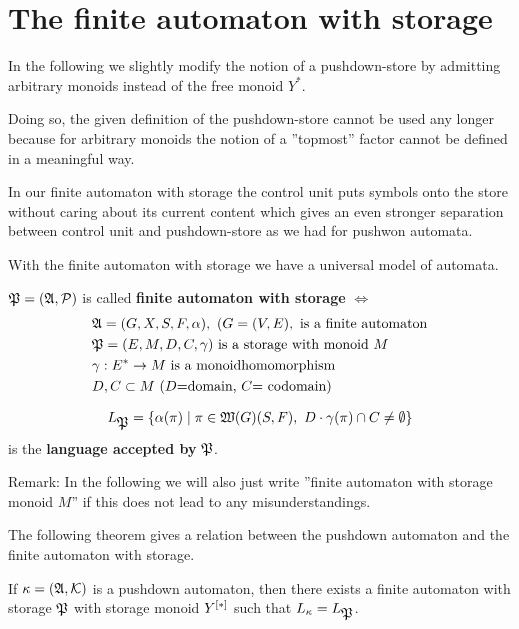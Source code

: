 \section{The finite automaton with storage}

In the following we slightly modify the notion of a pushdown-store by admitting
arbitrary monoids instead of the free monoid $Y^*$.

Doing so, the given definition of the pushdown-store cannot be used any longer
because for arbitrary monoids the notion of a ''topmost'' factor cannot be
defined in a meaningful way.

In our finite automaton with storage the control unit puts symbols onto the
store without caring about its current content which gives an even stronger
separation between control unit and pushdown-store as we had for pushwon
automata.

With the finite automaton with storage we have a universal model of automata.

\begin{definition}
$\mbox{$\mathfrak{P}$} = (\mbox{$\mathfrak{A}$}, \mbox{$\mathcal{P}$})$ is called {\bf finite automaton with storage}
$\iff$
\begin{eqnarray*}
& \mbox{$\mathfrak{A}$}=(G, X, S, F, \alpha),\ (G=(V,E),\text{ is a finite automaton} \\
& \mbox{$\mathfrak{P}$}=(E, M, D, C, \gamma)\text{ is a storage with monoid }M \\
& \gamma: E^* \to M\text{ is a monoidhomomorphism} \\
& D,C \subset M\text{ ($D$=domain, $C$= codomain)}
\end{eqnarray*}
\end{definition}

\[ L_{\mbox{$\mathfrak{P}$}} = \mbox{$\{\alpha(\pi) \mid \pi \in \mbox{$\mathfrak{W}(G)$}(S, F),\ D\cdot
\gamma(\pi) \cap C \neq \emptyset\}$}
\]
is the {\bf language accepted by} $\mbox{$\mathfrak{P}$}$.

Remark: In the following we will also just write ''finite automaton with storage
monoid $M$'' if this does not lead to any misunderstandings.

\bigskip
The following theorem gives a relation between the pushdown automaton and the
finite automaton with storage.

\begin{theorem}
If $\kappa = (\mbox{$\mathfrak{A}$}, \mbox{$\mathcal{K}$})$ is a pushdown automaton, then there exists a
finite automaton with storage $\mbox{$\mathfrak{P}$}$ with storage monoid $\mbox{${Y}^{[*]}$}$ such
that $L_{\kappa} = L_{\mbox{$\mathfrak{P}$}}$.
\end{theorem}

